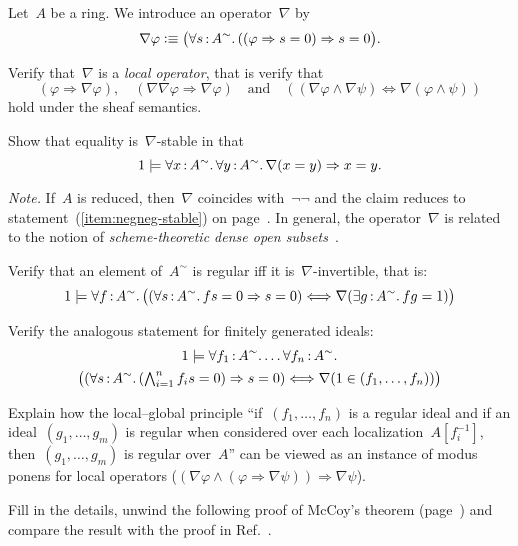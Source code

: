 \documentclass{ws-rv9x6}
\begin{document}
{\begin{exercise}%
\label{ex:local-global}%
Let~$A$ be a ring. We introduce an operator~$\nabla$ by
\[ \nabla\varphi \vcentcolon\equiv \bigl(\forall s\,{:}\,A^\sim\mathpunct{.} ((\varphi \Rightarrow s = 0)
\Rightarrow s = 0\bigr).\]
\begin{alphlist}[(f)]
\item Verify that~$\nabla$ is a \emph{local operator}, that is verify that
\[ (\varphi \Rightarrow \nabla\varphi), \quad
(\nabla\nabla\varphi \Rightarrow \nabla\varphi) \quad\text{and}\quad
((\nabla\varphi \wedge \nabla\psi) \Leftrightarrow \nabla(\varphi \wedge \psi))
\]
hold under the sheaf semantics.
\item Show that equality is~$\nabla$-stable in that
\[ 1 \models \forall x\,{:}\,A^\sim\mathpunct{.} \forall y\,{:}\,A^\sim\mathpunct{.} \nabla(x = y) \Rightarrow x = y. \]

{\scriptsize\emph{Note.} If~$A$ is reduced, then~$\nabla$ coincides
with~$\neg\neg$ and the claim reduces to statement~(\ref{item:negneg-stable})
on page~\pageref{item:negneg-stable}. In general, the operator~$\nabla$ is
related to the notion of \emph{scheme-theoretic dense open
subsets}~\cite[Lemma~9.11]{blechschmidt:phd}.\par}
\item Verify that an element of~$A^\sim$ is regular iff it
is~$\nabla$-invertible, that is:
\[ 1 \models \forall f\,{:}\,A^\sim\mathpunct{.}
  \bigl(
    (\forall s\,{:}\,A^\sim\mathpunct{.} fs = 0 \Rightarrow s = 0) \Longleftrightarrow
    \nabla(\exists g\,{:}\,A^\sim\mathpunct{.} fg = 1)
  \bigr)
\]
\item Verify the analogous statement for finitely generated ideals:
\begin{multline*}1 \models \forall f_1\,{:}\,A^\sim\mathpunct{.} \ldots \forall f_n\,{:}\,A^\sim\mathpunct{.} \\
  \bigl(
    (\forall s\,{:}\,A^\sim\mathpunct{.} (\textstyle\bigwedge_{i=1}^n f_is = 0) \Rightarrow s = 0) \Longleftrightarrow
    \nabla(1 \in (f_1,\ldots,f_n))
  \bigr) \end{multline*}
\item Explain how the local--global principle ``if~$(f_1,\ldots,f_n)$ is a
regular ideal and if an ideal~$(g_1,\ldots,g_m)$ is regular when considered
over each localization~$A[f_i^{-1}]$, then~$(g_1,\ldots,g_m)$ is regular
over~$A$'' can be viewed as an instance of modus ponens for local operators
($(\nabla\varphi \wedge (\varphi \Rightarrow \nabla\psi)) \Longrightarrow
\nabla\psi$).
\item Fill in the details, unwind the following proof of McCoy's theorem
(page~\pageref{par:mccoy}) and compare the result with the proof in
Ref.~\cite[Theorem~2.4]{coquand-quitte:constructive-finite-free-resolutions}.


\end{alphlist}
\end{exercise}}
\end{document}
